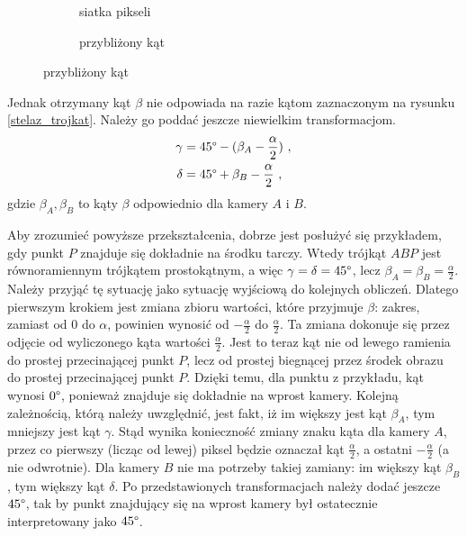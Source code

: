 \begin{figure}[h!]
\centering
\begin{subfigure}{.5\textwidth}
  \centering
  
  \caption{siatka pikseli}
  \label{zdjecie_interpolacja}
\end{subfigure}%
\begin{subfigure}{.5\textwidth}
  \centering
  
  \caption{przybliżony kąt}
  \label{kat_interpolacja}
\end{subfigure}
\end{figure}

Jednak otrzymany kąt $\beta$ nie odpowiada na razie kątom zaznaczonym na rysunku \ref{stelaz_trojkat}. Należy go poddać jeszcze niewielkim transformacjom. 
\begin{align*}
\gamma &=  45\degree - (\beta_A - \frac{\alpha}{2})\ , \\
\delta &=  45\degree + \beta_B - \frac{\alpha}{2}\ ,
\end{align*}
gdzie $\beta_A, \beta_B$ to kąty $\beta$ odpowiednio dla kamery $A$ i $B$.

Aby zrozumieć powyższe przekształcenia, dobrze jest posłużyć się przykładem, gdy punkt $P$ znajduje się dokładnie na środku tarczy. Wtedy trójkąt $ABP$ jest równoramiennym trójkątem prostokątnym, a więc $\gamma = \delta = 45\degree$, lecz $\beta_A = \beta_B = \frac{\alpha}{2}$. Należy przyjąć tę sytuację jako sytuację wyjściową do kolejnych obliczeń. Dlatego pierwszym krokiem jest zmiana zbioru wartości, które przyjmuje $\beta$: zakres, zamiast od $0$ do $\alpha$, powinien wynosić od $-\frac{\alpha}{2}$ do $\frac{\alpha}{2}$. Ta zmiana dokonuje się przez odjęcie od wyliczonego kąta wartości $\frac{\alpha}{2}$. Jest to teraz kąt nie od lewego ramienia do prostej przecinającej punkt $P$, lecz od prostej biegnącej przez środek obrazu do prostej przecinającej punkt $P$. Dzięki temu, dla punktu z przykładu, kąt wynosi $0\degree$, ponieważ znajduje się dokładnie na wprost kamery. Kolejną zależnością, którą należy uwzględnić, jest fakt, iż im większy jest kąt $\beta_A$, tym mniejszy jest kąt $\gamma$. Stąd wynika konieczność zmiany znaku kąta dla kamery $A$, przez co pierwszy (licząc od lewej) piksel będzie oznaczał kąt $\frac{\alpha}{2}$, a ostatni $-\frac{\alpha}{2}$ (a nie odwrotnie). Dla kamery $B$ nie ma potrzeby takiej zamiany: im większy kąt $\beta_B$, tym większy kąt $\delta$. Po przedstawionych transformacjach należy dodać jeszcze $45 \degree$, tak by punkt znajdujący się na wprost kamery był ostatecznie interpretowany jako $45 \degree$.

